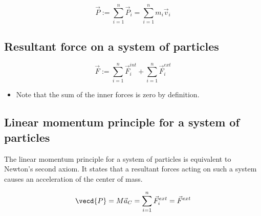 \documentclass[10pt,a4paper]{scrartcl}
\begin{document}
\begin{multicols*}{2}
\begin{equation*}
\vec{P}:=\sum\limits_{i=1}^n\vec{P}_i=\sum\limits_{i=1}^nm_i\vec{v}_i
\end{equation*}

\subsection{Resultant force on a system of particles}

\begin{equation*}
\vec{F}:=\sum\limits_{i=1}^n\vec{F}_i^{int}+\sum\limits_{i=1}^n\vec{F}_i^{ext}
\end{equation*}

\begin{itemize}
\item Note that the sum of the inner forces is zero by definition.
\end{itemize}

\subsection{Linear momentum principle for a system of particles}

The linear momentum principle for a system of particles is equivalent to Newton's second axiom. It states that a resultant forces acting on such a system causes an acceleration of the center of mass.

\begin{equation*}
\vecd{P}=M{\vec{a}_C}=\sum\limits_{i=1}^n \vec{F}_i^{ext}=\vec{F}^{ext}
\end{equation*}



\end{multicols*}
\end{document}
